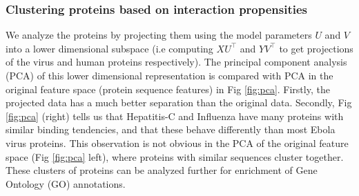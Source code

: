\documentclass[runningheads,a4paper]{llncs}
\begin{document}
\subsubsection{Clustering proteins based on interaction propensities}
We analyze the proteins by projecting them using the model parameters $U$ and $V$ into a lower dimensional subspace 
(i.e computing $X U^\intercal$ and $Y V^\intercal$ to get projections of the virus and human proteins respectively).  
The principal component analysis (PCA) of this lower dimensional representation is compared with PCA in the original feature space (protein sequence features) in Fig \ref{fig:pca}. 
Firstly, the projected data has a much better separation than the original data.
Secondly, Fig \ref{fig:pca} (right) tells us that Hepatitis-C and Influenza have many proteins with similar binding tendencies, and that these behave differently than most Ebola virus proteins. This observation is not obvious in the PCA of the original feature space (Fig \ref{fig:pca} left), where proteins with similar sequences cluster together.
These clusters of proteins can be analyzed further for enrichment of Gene Ontology (GO) annotations.



\begin{figure}
\begin{floatrow}
\end{floatrow}
\end{figure}
\end{document}
